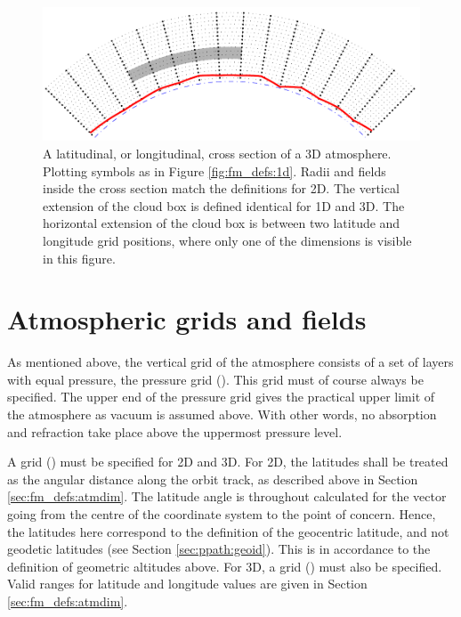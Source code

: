\begin{figure}[p]
 \begin{center}
  \includegraphics*[width=0.98\hsize]{atm_dim_3dcross}
  \caption{A latitudinal, or longitudinal, cross section of a 3D atmosphere. 
    Plotting symbols as in Figure \ref{fig:fm_defs:1d}. Radii and
    fields inside the cross section match the definitions for 2D.
    The vertical extension
    of the cloud box is defined identical for 1D and 3D. The horizontal 
    extension of the cloud box is between two latitude and longitude grid
    positions, where only one of the dimensions is visible in this figure.}
  \label{fig:fm_defs:3dcross}
 \end{center}
\end{figure}



\section{Atmospheric grids and fields}
\label{sec:fm_defs:grids}

As mentioned above, the vertical grid of the atmosphere consists of a
set of layers with equal pressure, the pressure grid
().  This grid must of course always be specified.
The upper end of the pressure grid gives the practical upper limit of
the atmosphere as vacuum is assumed above. With other words, no
absorption and refraction take place above the uppermost pressure
level.

A  grid () must be specified
for 2D and 3D.  For 2D, the latitudes shall be treated as the angular
distance along the orbit track, as described above in
Section \ref{sec:fm_defs:atmdim}.  The latitude angle is throughout
calculated for the vector going from the centre of the coordinate
system to the point of concern. Hence, the latitudes here correspond
to the definition of the geocentric latitude, and not geodetic
latitudes (see Section \ref{sec:ppath:geoid}). This is in accordance
to the definition of geometric altitudes above. For 3D, a
 grid () must also be specified.
Valid ranges for latitude and longitude values are given in
Section \ref{sec:fm_defs:atmdim}.

